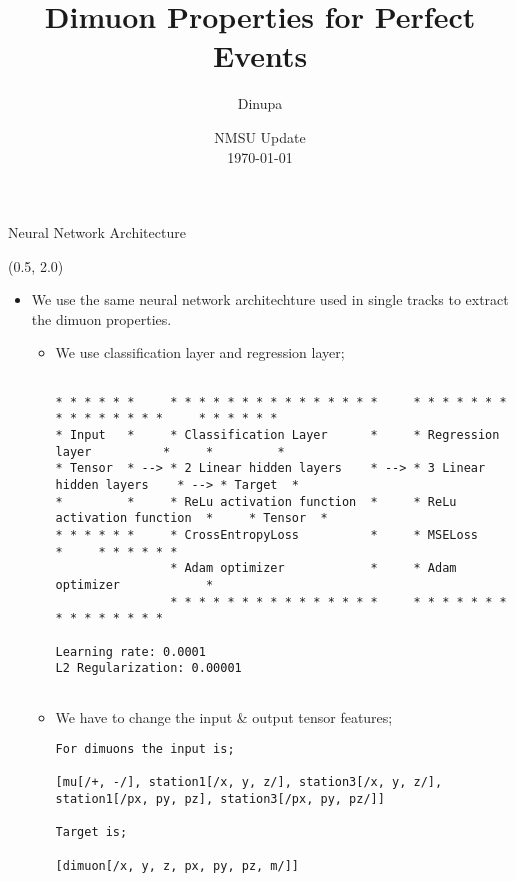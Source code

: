 \documentclass[10pt, xcolor={dvipsnames}, aspectratio = 169, sans,mathserif]{beamer}
\title{Dimuon Properties for Perfect Events}
\author{Dinupa}
\date{NMSU Update
\\ \today}
\begin{document}
\begin{frame}
    \maketitle
\end{frame}


\begin{frame}[fragile]{Neural Network Architecture}

\begin{textblock}{14.0}(0.5, 2.0)
\begin{itemize}

    \item We use the same neural network architechture used in single tracks to extract the dimuon properties.
    
    \begin{itemize}
    
    \item We use classification layer and regression layer;
    
        \begin{scriptsize}
        \begin{verbatim}
        
* * * * * *     * * * * * * * * * * * * * * *     * * * * * * * * * * * * * * *     * * * * * *
* Input   *     * Classification Layer      *     * Regression layer          *     *         *
* Tensor  * --> * 2 Linear hidden layers    * --> * 3 Linear hidden layers    * --> * Target  *
*         *     * ReLu activation function  *     * ReLu activation function  *     * Tensor  *
* * * * * *     * CrossEntropyLoss          *     * MSELoss                   *     * * * * * *
                * Adam optimizer            *     * Adam optimizer            *
                * * * * * * * * * * * * * * *     * * * * * * * * * * * * * * *

Learning rate: 0.0001
L2 Regularization: 0.00001
        
        \end{verbatim}
        \end{scriptsize}
        
        \item We have to change the input \& output tensor features;
        
        \begin{scriptsize}
        \begin{verbatim}
For dimuons the input is;
        
[mu[/+, -/], station1[/x, y, z/], station3[/x, y, z/], station1[/px, py, pz], station3[/px, py, pz/]]
        
Target is;
        
[dimuon[/x, y, z, px, py, pz, m/]]
        \end{verbatim}
        \end{scriptsize}
    
    \end{itemize}

\end{itemize}
\end{textblock}

\end{frame}
\end{document}
